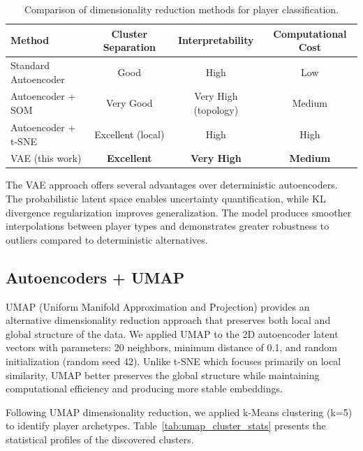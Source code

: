 \documentclass{article}
\begin{document}
\begin{table}[h]
\centering
\begin{tabular}{|l|c|c|c|}
\hline
\textbf{Method} & \textbf{Cluster Separation} & \textbf{Interpretability} & \textbf{Computational Cost} \\
\hline
Standard Autoencoder & Good & High & Low \\
\hline
Autoencoder + SOM & Very Good & Very High (topology) & Medium \\
\hline
Autoencoder + t-SNE & Excellent (local) & High & High \\
\hline
VAE (this work) & \textbf{Excellent} & \textbf{Very High} & \textbf{Medium} \\
\hline
\end{tabular}
\caption{Comparison of dimensionality reduction methods for player classification.}
\label{tab:dr_comparison}
\end{table}

The VAE approach offers several advantages over deterministic autoencoders. The probabilistic latent space enables uncertainty quantification, while KL divergence regularization improves generalization. The model produces smoother interpolations between player types and demonstrates greater robustness to outliers compared to deterministic alternatives.

\subsection{Autoencoders + UMAP}

UMAP (Uniform Manifold Approximation and Projection) provides an alternative dimensionality reduction approach that preserves both local and global structure of the data. We applied UMAP to the 2D autoencoder latent vectors with parameters: 20 neighbors, minimum distance of 0.1, and random initialization (random seed 42). Unlike t-SNE which focuses primarily on local similarity, UMAP better preserves the global structure while maintaining computational efficiency and producing more stable embeddings.

Following UMAP dimensionality reduction, we applied k-Means clustering (k=5) to identify player archetypes. Table~\ref{tab:umap_cluster_stats} presents the statistical profiles of the discovered clusters.
\end{document}
